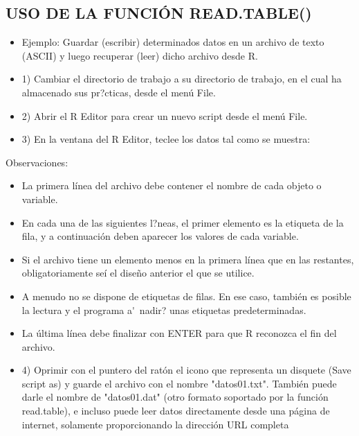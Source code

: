 \documentclass[12pt,letterpaper]{article}\usepackage[]{graphicx}\usepackage[]{color}
\begin{document}
\subsection{USO DE LA FUNCI\'ON READ.TABLE()}
\begin{itemize}
\item Ejemplo: Guardar (escribir) determinados datos en un archivo de texto (ASCII) y luego recuperar
(leer) dicho archivo desde R.
\end{itemize}
\begin{itemize}
\item {1) } Cambiar el directorio de trabajo a su directorio de trabajo, en el cual ha almacenado sus
pr?cticas, desde el men\'u File.
\item {2) } Abrir el R Editor para crear un nuevo script desde el men\'u File.
\item {3) } En la ventana del R Editor, teclee los datos tal como se muestra:
\end{itemize}
Observaciones:
\begin{itemize}
\item La primera l\'inea del archivo debe contener el nombre de cada objeto o variable.
\item En cada una de las siguientes l?neas, el primer elemento es la etiqueta de la fila, y a continuaci\'on deben aparecer los valores de cada variable.
\item Si el archivo tiene un elemento menos en la primera l\'inea que en las restantes,
obligatoriamente se\'i el dise\~no anterior el que se utilice.
\item A menudo no se dispone de etiquetas de filas. En ese caso, tambi\'en es posible la lectura y el
programa a\'~nadir? unas etiquetas predeterminadas.
\item La \'ultima l\'inea debe finalizar con ENTER para que R reconozca el fin del archivo.
\end{itemize}
\begin{itemize}
\item{4) } Oprimir con el puntero del rat\'on el icono que representa un disquete (Save script as) y guarde el archivo con el nombre "datos01.txt". Tambi\'en puede darle el nombre de "datos01.dat" (otro formato soportado por la funci\'on read.table), e incluso puede leer datos directamente desde una p\'agina de internet, solamente proporcionando la direcci\'on URL completa
\end{itemize}
\end{document}
